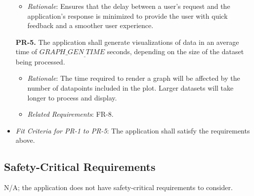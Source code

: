 \documentclass[12pt]{article}
\begin{document}
\begin{enumerate}
  \begin{itemize}
    \item \textit{Rationale}: Ensures that the delay between a user's request and the application's response is minimized to provide the user with quick feedback and a smoother user experience.
  \end{itemize}
\item[\textbf{PR-5.}] The application shall generate visualizations of data in
an average time of $GRAPH\_GEN_\_TIME$ seconds, depending on the size of the
dataset being processed.
  \begin{itemize}
    \item \textit{Rationale}: The time required to render a graph will be affected by the number of datapoints included in the plot. Larger datasets will take longer to process and display.
    \item \textit{Related Requirements}: FR-8.
  \end{itemize}
\end{enumerate}
\begin{itemize}
  \item \textit{Fit Criteria for PR-1 to PR-5}: The application shall satisfy the requirements above.
\end{itemize}

\subsection{Safety-Critical Requirements}
N/A; the application does not have safety-critical requirements to consider.
\end{document}
